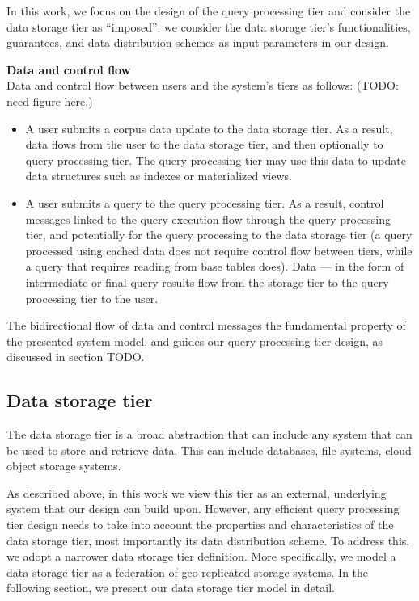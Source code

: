 In this work, we focus on the design of the query processing tier and consider the data storage tier as ``imposed'':
we consider the data storage tier's functionalities, guarantees, and data distribution schemes as input parameters in
our design.

\bigskip

\noindent
\textbf{Data and control flow} \\

\noindent
Data and control flow between users and the system's tiers as follows: (TODO: need figure here.)
\begin{itemize}
  \item A user submits a corpus data update to the data storage tier.
  As a result, data flows from the user to the data storage tier, and then optionally to query processing tier.
  The query processing tier may use this data to update data structures such as indexes or materialized views.

  \item A user submits a query to the query processing tier.
  As a result, control messages linked to the query execution flow through the query processing tier, and potentially
  for the query processing to the data storage tier (a query processed using cached data does not require control flow
  between tiers, while a query that requires reading from base tables does).
  Data --- in the form of intermediate or final query results flow from the storage tier to the query processing tier to
  the user.
\end{itemize}

The bidirectional flow of data and control messages the fundamental property of the presented system model, and guides
our query processing tier design, as discussed in section TODO.

\subsection{Data storage tier}

The data storage tier is a broad abstraction that can include any system that can be used to store and retrieve data.
This can include databases, file systems, cloud object storage systems.

As described above, in this work we view this tier as an external, underlying system that our design can build upon.
However, any efficient query processing tier design needs to take into account the properties and characteristics of the
data storage tier, most importantly its data distribution scheme.
To address this, we adopt a narrower data storage tier definition.
More specifically, we model a data storage tier as a federation of geo-replicated storage systems.
In the following section, we present our data storage tier model in detail.


